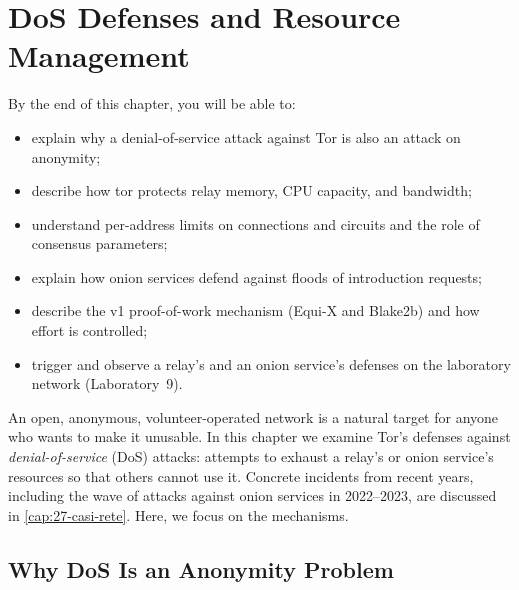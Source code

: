 \chapter{DoS Defenses and Resource Management}\label{cap:15-dos}

\begin{obiettivi}
By the end of this chapter, you will be able to:
\begin{itemize}[nosep]
  \item explain why a denial-of-service attack against Tor is also an attack on anonymity;
  \item describe how tor protects relay memory, CPU capacity, and bandwidth;
  \item understand per-address limits on connections and circuits and the role of consensus parameters;
  \item explain how onion services defend against floods of introduction requests;
  \item describe the v1 proof-of-work mechanism (Equi-X and Blake2b) and how effort is controlled;
  \item trigger and observe a relay's and an onion service's defenses on the laboratory network (Laboratory~9).
\end{itemize}
\end{obiettivi}

An open, anonymous, volunteer-operated network is a natural target for anyone who wants to make it unusable. In this chapter we examine Tor's defenses against \emph{denial-of-service} (DoS) attacks: attempts to exhaust a relay's or onion service's resources so that others cannot use it. Concrete incidents from recent years, including the wave of attacks against onion services in 2022--2023, are discussed in \cref{cap:27-casi-rete}. Here, we focus on the mechanisms.

\section{Why DoS Is an Anonymity Problem}\label{sec:dos-anonimato}

